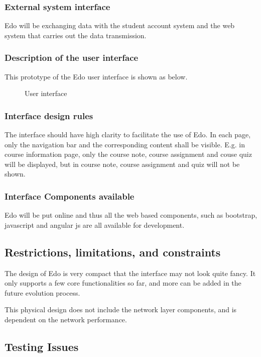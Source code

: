 \documentclass[paper=a4, fontsize=11pt]{scrartcl}
\numberwithin{equation}{section}		%
\numberwithin{figure}{section}			%
\numberwithin{table}{section}				%
\begin{document}
\subsubsection{External system interface}
Edo will be exchanging data with the student account system and the web system that carries out the data transmission. 

\subsubsection{Description of the user interface}
This prototype of the Edo user interface is shown as below.
\begin{figure}[!ht]
	\begin{center}
	\end{center}
	\caption{User interface}
\end{figure}




\subsubsection{Interface design rules}
The interface should have high clarity to facilitate the use of Edo. In each page, only the navigation bar and the corresponding content shall be visible. E.g. in course information page, only the course note, course assignment and couse quiz will be displayed, but in course note, course assignment and quiz will not be shown.

\subsubsection{Interface Components available}
Edo will be put online and thus all the web based components, such as bootstrap, javascript and angular js are all available for development. 


\subsection{Restrictions, limitations, and constraints}
The design of Edo is very compact that the interface may not look quite fancy. It only supports a few core functionalities so far, and more can be added in the future evolution process.

This physical design does not include the network layer components, and is dependent on the network performance.
\subsection{Testing Issues}
\end{document}
